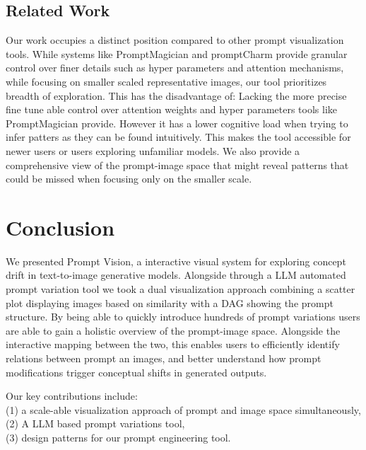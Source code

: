 \documentclass[
  a4paper,  %
  twoside,  %
  bibliography=totoc,
  headsepline,
  cleardoublepage=empty,
  parskip=half,
  draft=false
]{scrbook}
\begin{document}
\section{Related Work}
Our work occupies a distinct position compared to other prompt visualization tools. While systems like PromptMagician and promptCharm \cite{PromptMagician,promptCharm} provide granular control over finer details such as hyper parameters and attention mechanisms, while focusing on smaller scaled representative images, our tool prioritizes breadth of exploration. 
This has the disadvantage of: Lacking the more precise fine tune able control over attention weights and hyper parameters tools like PromptMagician provide. However it has a lower cognitive load when trying to infer patters as they can be found intuitively. This makes the tool accessible for newer users or users exploring unfamiliar models. We also provide a comprehensive view of the prompt-image space that might reveal patterns that could be missed when focusing only on the smaller scale.




















\chapter{Conclusion}




We presented Prompt Vision, a interactive visual system for exploring concept drift in text-to-image generative models. Alongside through a LLM automated prompt variation tool we  took a dual visualization approach combining a scatter plot displaying images based on similarity with a DAG showing the prompt structure. By being able to quickly introduce hundreds of prompt variations users are able to gain a holistic overview of the prompt-image space. Alongside the interactive mapping between the two, this enables users to efficiently identify relations between prompt an images, and better understand how prompt modifications trigger conceptual shifts in generated outputs.

Our key contributions include: \\(1) a scale-able visualization approach of prompt and image space simultaneously, \\(2) A LLM based prompt variations tool,\\ (3) design patterns for our prompt engineering tool.
\end{document}
